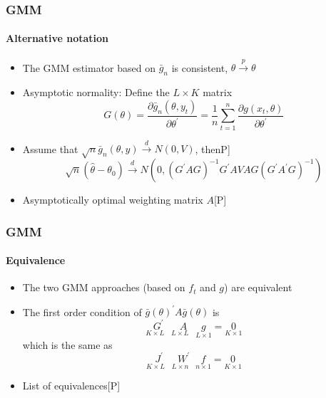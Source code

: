 \documentclass{beamer}
\begin{document}
\begin{frame}\frametitle{GMM}\framesubtitle{Alternative notation}
\begin{itemize}
    \item The GMM estimator based on $\bar{g}_{n}$ is consistent, $\hat{\theta}\overset{p}{\rightarrow }\theta $
    \item Asymptotic normality: Define the $L\times K$ matrix
    \begin{equation*}
    G(\theta )=\frac{\partial \bar{g}_{n}\left( \theta ,y_{t}\right) }{\partial\theta ^{\prime }}=\frac{1}{n}\sum_{t=1}^{n}\frac{\partial g(x_{t},\theta )}{\partial \theta ^{\prime }}
    \end{equation*}
    \item Assume that $\sqrt{n}\bar{g}_{n}(\theta ,y)\overset{d}{\rightarrow } N\left( 0,V\right) $, then\hfill \lbrack P]
    \begin{equation*}
    \sqrt{n}\left( \hat{\theta}-\theta _{0}\right) \overset{d}{\rightarrow } N\left( 0,\left( G^{\prime }AG\right) ^{-1}G^{\prime }AVAG\left( G^{\prime}A^{\prime }G\right) ^{-1}\right)
    \end{equation*}
    \item Asymptotically optimal weighting matrix $A$\hfill [P]
\end{itemize}
\end{frame}


\begin{frame}\frametitle{GMM}\framesubtitle{Equivalence}
\begin{itemize}
    \item The two GMM approaches (based on $f_{t}$ and $g$) are equivalent
    \item The first order condition of $\bar{g}(\theta )^{\prime }A\bar{g}(\theta )$ is
    \begin{equation*}
    \underset{K\times L\quad }{G^{\prime }}\underset{L\times L\quad }{A}\underset{L\times 1}{g}=\underset{K\times 1}{0}
    \end{equation*}
    which is the same as
    \begin{equation*}
    \underset{K\times L\quad }{J^{\prime }}\underset{L\times n\quad }{W^{\prime }}\underset{n\times 1}{f}=\underset{K\times 1}{0}
    \end{equation*}
    \item List of equivalences\hfill [P]
\end{itemize}
\end{frame}
\end{document}
